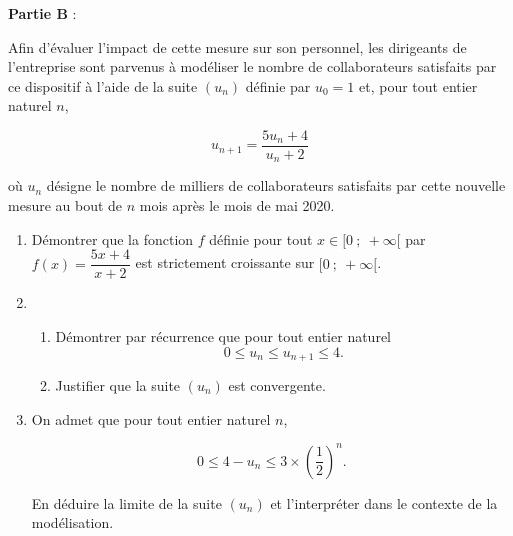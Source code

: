 \bigskip

\textbf{Partie B }:

\medskip

Afin d'évaluer l'impact de cette mesure sur son personnel, les dirigeants de l'entreprise sont parvenus à modéliser le nombre de collaborateurs satisfaits par ce dispositif à l'aide de la suite 
$\left(u_n\right)$ définie par $u_0 = 1$ et, pour tout entier naturel $n$,

\[u_{n+1}  = \dfrac{5u_n + 4}{u_n + 2}\]

où $u_n$ désigne le nombre de milliers de collaborateurs satisfaits par cette nouvelle mesure au bout de $n$ mois après le mois de mai 2020.

\medskip

\begin{enumerate}
\item Démontrer que la fonction $f$ définie pour tout $x \in  [0~;~ +\infty[$ par $f(x) = \dfrac{5x+4}{x+2}$ est 
strictement croissante sur $[0~;~+ \infty[$.
\item 
	\begin{enumerate}
		\item Démontrer par récurrence que pour tout entier naturel 
		\[0 \leqslant u_n \leqslant u_{n+1}  \leqslant  4.\]
		
		\item Justifier que la suite $\left(u_n\right)$ est convergente.
	\end{enumerate}
\item On admet que pour tout entier naturel $n$,

\[0  \leqslant 4 - u_n \leqslant 3 \times \left(\dfrac{1}{2}\right)^n.\]

En déduire la limite de la suite $\left(u_n\right)$ et l'interpréter dans le contexte de la modélisation.
\end{enumerate}

\bigskip

